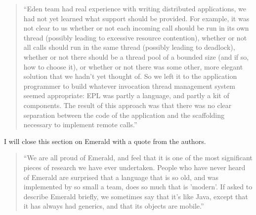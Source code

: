 \begin{quote}
``Eden team had real experience with writing distributed applications, we had not yet learned what support should be provided. For example, it was not clear to us whether or not each incoming call should be run in its own thread (possibly leading to excessive resource contention), whether or not all calls should run in the same thread (possibly leading to deadlock), whether or not there should be a thread pool of a bounded size (and if so, how to choose it), or whether or not there was some other, more elegant solution that we hadn’t yet thought of. So we left it to the application programmer to build whatever invocation thread management system seemed appropriate: EPL was partly a language, and partly a kit of components. The result of this approach was that there was no clear separation between the code of the application and the scaffolding necessary to implement remote calls.''~\cite{black2007development}
\end{quote}

I will close this section on Emerald with a quote from the authors.

\begin{quote}
``We are all proud of Emerald, and feel that it is one of the most significant pieces of research we have ever undertaken. People who have never heard of Emerald are surprised that a language that is so old, and was implemented by so small a team, does so much that is 'modern'. If asked to describe Emerald briefly, we sometimes say that it’s like Java, except that it has always had generics, and that its objects are mobile.''~\cite{black2007development}
\end{quote}